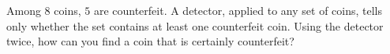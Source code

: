 Among $8$ coins, $5$ are counterfeit. A detector, applied to any set of coins, tells only whether the set contains at least one counterfeit coin. Using the detector twice, how can you find a coin that is certainly counterfeit?
